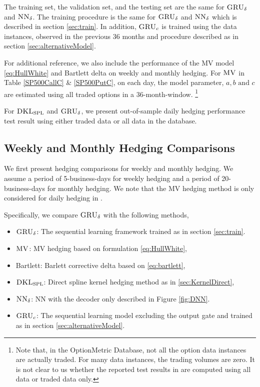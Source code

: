 \documentclass[letterpaper,12pt,titlepage,oneside,final]{book}
\numberwithin{equation}{section}
\theoremstyle{definition}
\newcommand{\model}{\textsc{GRU}_\delta}
\newcommand{\modelN}{\textsc{NN}_\delta}
\newcommand{\DKLs}{\bf\textsc{DKL}_{\text{SPL}}}
\newcommand{\MV}{\bf \textsc{MV}}
\begin{document}
 The training set, the validation set, and the testing set are the same for $\model$ and $\modelN$. The training procedure is the same for $\model$ and $\modelN$ which is described in section \ref{sec:train}. In addition, $\textsc{GRU}_{c}$ is trained using the data instances, observed in the previous 36 months and procedure described as in section \ref{sec:alternativeModel}. 
 
 For additional reference, we also include the performance of the MV model \eqref{eq:HullWhite}  and Bartlett delta on weekly and monthly hedging. For $\MV$ in Table \ref{SP500CallC} \& \ref{SP500PutC}, on each day,  the model parameter, $a,b \text{ and } c$ are estimated using all {traded} options in a 36-month-window. \footnote{Note that, in the OptionMetric Database, not all the option data instances are actually traded. For many data instances, the trading volumes are zero. It is not clear to us whether the reported test results in \citep{hulloptimal} are computed using all data or traded data only.} 






 For $\DKLs$ and $\model$, we present out-of-sample daily hedging performance test result using either {traded} data or {all} data in the database.  


\subsection{Weekly and Monthly Hedging Comparisons}\label{sec:weekly}



We  first present hedging comparisons for weekly and monthly hedging. We assume a period of 5-business-days  for weekly hedging and a  period of  20-business-days  for monthly hedging.
We note that the MV hedging method is only considered for daily hedging in \cite{hulloptimal}.

Specifically, we compare $\model$ with the following methods,
\begin{itemize}
	\item $\model$: The sequential learning framework trained as in section \ref{sec:train}.
	\item $\MV$: MV hedging   based on formulation \eqref{eq:HullWhite},
    \item Bartlett: Barlett corrective  delta based on \eqref{eq:bartlett},
    \item $\DKLs$: Direct spline kernel hedging method as in \ref{sec:KernelDirect},
    \item $\modelN$: NN with the decoder only described in Figure \ref{fig:DNN}.
    \item $\textsc{GRU}_{c}$: The sequential learning model excluding the output gate and  trained as in section \ref{sec:alternativeModel}.
\end{itemize}
\end{document}
